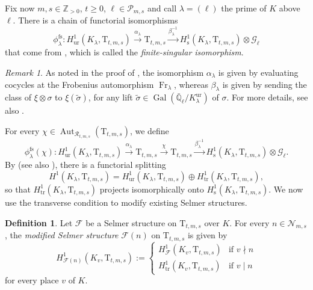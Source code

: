 \documentclass[12pt,reqno]{amsart}
\theoremstyle{definition}
\newtheorem{definition}[theorem]{Definition}
\theoremstyle{remark}
\newtheorem{remark}[theorem]{Remark}
\newcommand{\numberset}{\mathbb}
\newcommand{\Q}{\numberset{Q}}
\newcommand{\Z}{\numberset{Z}}
\newcommand{\T}{\boldsymbol{\mathrm{T}}}
\newcommand{\calR}{\mathcal{R}}
\DeclareMathOperator{\Gal}{Gal}
\DeclareMathOperator{\Aut}{Aut}
\DeclareMathOperator{\Fr}{Fr}
\newcommand{\fs}{\mathrm{fs}}
\newcommand{\tr}{\mathrm{tr}}
\newcommand{\s}{\mathrm{s}}
\newcommand{\ur}{\mathrm{ur}}
\newcommand{\ga}{\alpha}
\newcommand{\gb}{\beta}
\newcommand{\gl}{\lambda}
\newcommand{\gs}{\sigma}
\begin{document}
Fix now $m,s\in\Z_{>0}$, $t\ge 0$, $\ell\in\mathcal{P}_{m,s}$ and call $\gl=(\ell)$ the prime of $K$ above $\ell$. There is a chain of functorial isomorphisms
\begin{equation}\label{eq:definition-finite-singular}
    \phi_\lambda^{\fs}\colon H^1_{\ur}(K_\gl,\T_{t,m,s})\overset{\ga_\gl}{\longrightarrow} \T_{t,m,s}\overset{\gb_\gl^{-1}}{\longrightarrow} H^1_{\s}(K_\gl,\T_{t,m,s})\otimes \mathcal{G}_\ell
\end{equation}
that come from \cite[Proposition 4.7]{Buyukboduk:big-Heegner-point-kolyvagin-system}, which is called the \emph{finite-singular isomorphism}.

\begin{remark}
        As noted in the proof of \cite[Proposition 1.1.7]{Howard04:heegner-point-kolyvagin-system}, the isomorphism $\ga_\gl$ is given by evaluating cocycles at the Frobenius automorphism $\Fr_\gl$, whereas $\gb_\gl$ is given by sending the class of $\xi\otimes\gs$ to $\xi(\tilde{\gs})$, for any lift $\tilde{\gs}\in\Gal(\bar{\Q}_\ell/K_\gl^{\ur})$ of $\gs$. For more details, see also \cite[Lemma 2.8]{mastella-zerman2025:anticyclotomic}.
\end{remark}

For every $\chi\in \Aut_{\calR_{t,m,s}}(\T_{t,m,s})$, we define
\begin{equation*}
    \phi_\lambda^{\fs}(\chi)\colon H^1_{\ur}(K_\gl,\T_{t,m,s})\overset{\ga_\gl}{\longrightarrow} \T_{t,m,s}\overset{\chi}{\longrightarrow} \T_{t,m,s}\overset{\gb_\gl^{-1}}{\longrightarrow} H^1_{\s}(K_\gl,\T_{t,m,s})\otimes \mathcal{G}_\ell.
\end{equation*}
By \cite[Lemma 4.10]{Buyukboduk:big-Heegner-point-kolyvagin-system} (see also \cite[Lemma 1.2.4]{Mazur-Rubin:Kolyvagin-systems}), there is a functorial splitting 
\begin{equation*}
            H^1(K_\gl,\T_{t,m,s})=H_{\ur}^1(K_\gl,\T_{t,m,s})\oplus H_{\tr}^1(K_\gl,\T_{t,m,s}),
\end{equation*}
so that $H_{\tr}^1(K_\gl,\T_{t,m,s})$ projects isomorphically onto $H_{\s}^1(K_\gl,\T_{t,m,s})$. We now use the transverse condition to modify existing Selmer structures.

\begin{definition}
        Let $\mathcal{F}$ be a Selmer structure on $\T_{t,m,s}$ over $K$. For every $n\in\mathcal{N}_{m,s}$, the \emph{modified Selmer structure} $\mathcal{F}(n)$ on $\T_{t,m,s}$ is given by
        \begin{equation*}
            H^1_{\mathcal{F}(n)}(K_v,\T_{t,m,s}):=\begin{cases}
                H^1_{\mathcal{F}}(K_v,\T_{t,m,s}) &\text{if $v\nmid n$}\\
                H^1_{\tr}(K_v,\T_{t,m,s}) &\text{if $v\mid n$}
            \end{cases}
        \end{equation*}
        for every place $v$ of $K$.
\end{definition}
\end{document}
